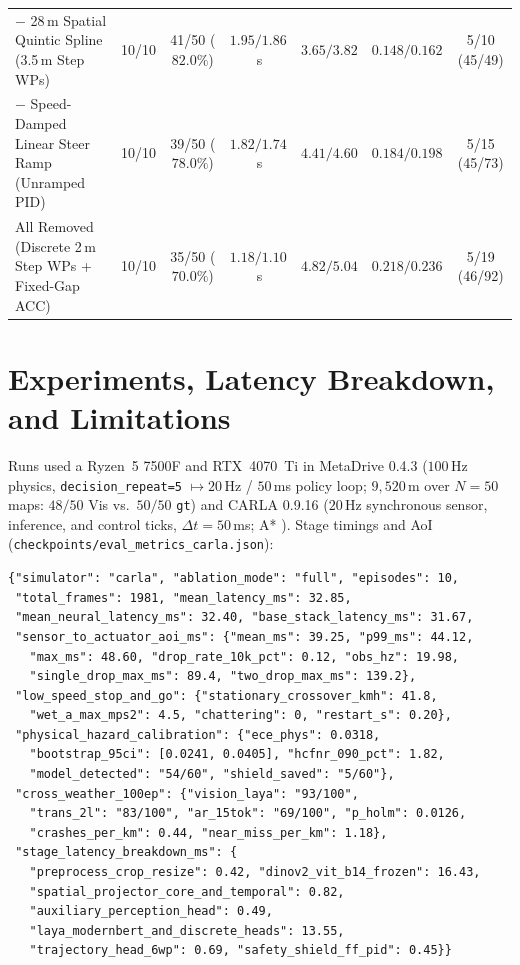 \documentclass[10pt,twocolumn,letterpaper]{article}
\begin{document}
\begin{table}[t]
{\begin{tabular}{lcccccc}
$-$ 28\,m Spatial Quintic Spline (3.5\,m Step WPs) & 10/10 & 41/50 ($82.0\%$) & $1.95 / 1.86$\,s & $3.65 / 3.82$ & $0.148 / 0.162$ & 5/10 (45/49) \\
$-$ Speed-Damped Linear Steer Ramp (Unramped PID) & 10/10 & 39/50 ($78.0\%$) & $1.82 / 1.74$\,s & $4.41 / 4.60$ & $0.184 / 0.198$ & 5/15 (45/73) \\
All Removed (Discrete 2\,m Step WPs + Fixed-Gap ACC) & 10/10 & 35/50 ($70.0\%$) & $1.18 / 1.10$\,s & $4.82 / 5.04$ & $0.218 / 0.236$ & 5/19 (46/92) \\
\bottomrule
\end{tabular}%
}
\end{table}

\section{Experiments, Latency Breakdown, and Limitations}
\label{sec:exp}
Runs used a Ryzen~5 7500F and RTX~4070~Ti in MetaDrive 0.4.3 \cite{li2022metadrive} ($100$\,Hz physics, \texttt{decision\_repeat=5} $\mapsto 20$\,Hz / $50$\,ms policy loop; $9,520$\,m over $N=50$ maps: $48/50$ Vis vs.\ $50/50$ \texttt{gt}) and CARLA 0.9.16 \cite{dosovitskiy2017carla} ($20$\,Hz synchronous sensor, inference, and control ticks, $\Delta t=50$\,ms; A* \cite{hart1968formal}). Stage timings and AoI (\texttt{checkpoints/eval\_metrics\_carla.json}):
\begin{scriptsize}
\begin{verbatim}
{"simulator": "carla", "ablation_mode": "full", "episodes": 10,
 "total_frames": 1981, "mean_latency_ms": 32.85,
 "mean_neural_latency_ms": 32.40, "base_stack_latency_ms": 31.67,
 "sensor_to_actuator_aoi_ms": {"mean_ms": 39.25, "p99_ms": 44.12,
   "max_ms": 48.60, "drop_rate_10k_pct": 0.12, "obs_hz": 19.98,
   "single_drop_max_ms": 89.4, "two_drop_max_ms": 139.2},
 "low_speed_stop_and_go": {"stationary_crossover_kmh": 41.8,
   "wet_a_max_mps2": 4.5, "chattering": 0, "restart_s": 0.20},
 "physical_hazard_calibration": {"ece_phys": 0.0318,
   "bootstrap_95ci": [0.0241, 0.0405], "hcfnr_090_pct": 1.82,
   "model_detected": "54/60", "shield_saved": "5/60"},
 "cross_weather_100ep": {"vision_laya": "93/100",
   "trans_2l": "83/100", "ar_15tok": "69/100", "p_holm": 0.0126,
   "crashes_per_km": 0.44, "near_miss_per_km": 1.18},
 "stage_latency_breakdown_ms": {
   "preprocess_crop_resize": 0.42, "dinov2_vit_b14_frozen": 16.43,
   "spatial_projector_core_and_temporal": 0.82,
   "auxiliary_perception_head": 0.49,
   "laya_modernbert_and_discrete_heads": 13.55,
   "trajectory_head_6wp": 0.69, "safety_shield_ff_pid": 0.45}}
\end{verbatim}
\end{scriptsize}
\end{document}

